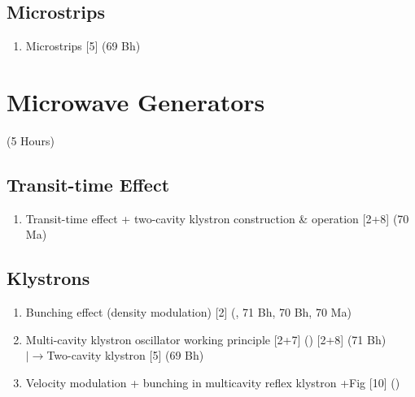 \documentclass[12pt]{article}
\newcommand{\lb}{\\$\left|\rightarrow\right.$}
\begin{document}
  \subsection{Microstrips}
    \begin{enumerate}[topsep=0pt, noitemsep]
      \item Microstrips \hfill [5] (69 Bh)
    \end{enumerate}

\pagebreak
\section{Microwave Generators}
\begin{center}(5 Hours)\end{center}

  \subsection{Transit-time Effect}
    \begin{enumerate}[topsep=0pt, noitemsep]
      \item Transit-time effect + two-cavity klystron construction \& operation \hfill [2+8] (70 Ma)
    \end{enumerate}

  \subsection{Klystrons}
    \begin{enumerate}[topsep=0pt, noitemsep]
      \item Bunching effect (density modulation) \hfill [2] (, 71 Bh, 70 Bh, 70 Ma)
      \item Multi-cavity klystron oscillator working principle \hfill [2+7] () [2+8] (71 Bh)
        \lb Two-cavity klystron \hfill [5] (69 Bh)
      \item Velocity modulation + bunching in multicavity reflex klystron +Fig \hfill [10] ()
    \end{enumerate}
\end{document}
